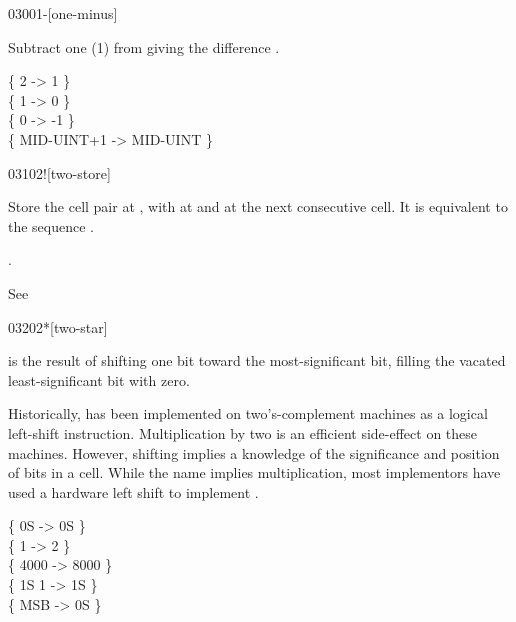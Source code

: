 \begin{worddef}{0300}{1-}[one-minus]
\item {}

	Subtract one (1) from  giving the difference
	.

	\begin{defer}
	\testing
		\{          2  ->        1 \} \\
		\{          1  ->        0 \} \\
		\{          0  ->       -1 \} \\
		\{ MID-UINT+1  -> MID-UINT \}
	\end{defer}
\end{worddef}


\begin{worddef}{0310}{2!}[two-store]
\item {}

	Store the cell pair  at , with
	 at  and  at the next
	consecutive cell. It is equivalent to the sequence
	  \word{!}  \word{!}.

\see {}.

	\begin{defer}
	\testing
		\rmfamily
		See \rref{core:,}{,}
	\end{defer}
\end{worddef}


\begin{worddef}{0320}{2*}[two-star]
\item {}

	 is the result of shifting  one bit toward
	the most-significant bit, filling the vacated least-significant
	bit with zero.

	\begin{defer}
	\rationale %
		Historically,  has been implemented on
		two's-complement machines as a logical left-shift instruction.
		Multiplication by two is an efficient side-effect on these
		machines. However, shifting implies a knowledge of the
		significance and position of bits in a cell. While the name
		implies multiplication, most implementors have used a hardware
		left shift to implement \word{2*}.

	\testing
		\{ 0S	 -> 0S \} \\
		\{ 1	 -> 2 \} \\
		\{ 4000  -> 8000 \} \\
		\{ 1S	 1  -> 1S \} \\
		\{ MSB	 -> 0S \}
	\end{defer}
\end{worddef}


